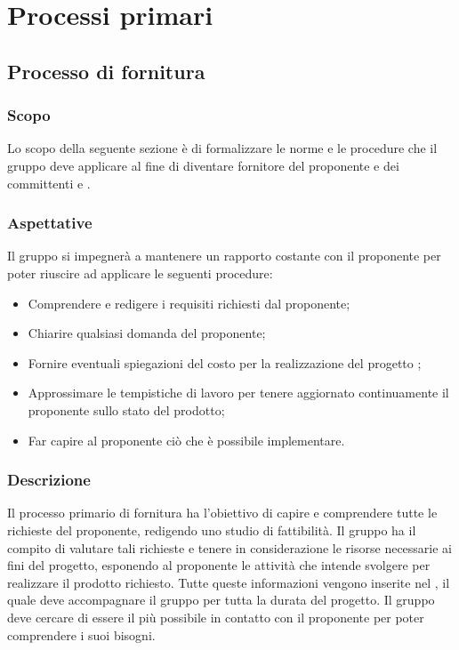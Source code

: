 \section{Processi primari}
\subsection{Processo di fornitura}
\subsubsection{Scopo}
Lo scopo della seguente sezione è di formalizzare le norme e le procedure che il gruppo \Gruppo{} deve applicare al fine di diventare fornitore del proponente \Proponente{} e dei committenti \VT{} e \CR{}.

\subsubsection{Aspettative}
Il gruppo si impegnerà a mantenere un rapporto costante con il proponente per poter riuscire ad applicare le seguenti procedure:
\begin{itemize}
	\item Comprendere e redigere i requisiti richiesti dal proponente;
	\item Chiarire qualsiasi domanda del proponente;
	\item Fornire eventuali spiegazioni del costo per la realizzazione del progetto \NomeProgetto{};
	\item Approssimare le tempistiche di lavoro per tenere aggiornato continuamente il proponente sullo stato del prodotto; 
	\item Far capire al proponente ciò che è possibile implementare.
\end{itemize}

\subsubsection{Descrizione} 
Il processo primario di fornitura ha l'obiettivo di capire e comprendere tutte le richieste del proponente, redigendo uno studio di fattibilità. 
Il gruppo \Gruppo{} ha il compito di valutare tali richieste e tenere in considerazione le risorse necessarie ai fini del progetto, esponendo al proponente \Proponente{} le attività che intende svolgere per realizzare il prodotto richiesto.
Tutte queste informazioni vengono inserite nel \PdP{}, il quale deve accompagnare il gruppo per tutta la durata del progetto.
Il gruppo \Gruppo{} deve cercare di essere il più possibile in contatto con il proponente per poter comprendere i suoi bisogni.\\

